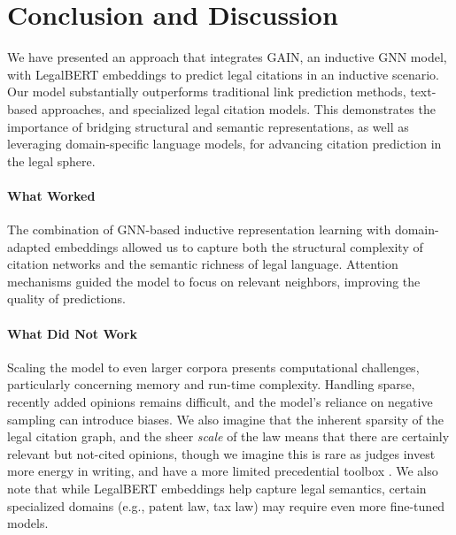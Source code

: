 \documentclass{article}
\begin{document}
\section{Conclusion and Discussion}
We have presented an approach that integrates GAIN, an inductive GNN model, with LegalBERT embeddings to predict legal citations in an inductive scenario. Our model substantially outperforms traditional link prediction methods, text-based approaches, and specialized legal citation models. This demonstrates the importance of bridging structural and semantic representations, as well as leveraging domain-specific language models, for advancing citation prediction in the legal sphere.

\paragraph{What Worked}
The combination of GNN-based inductive representation learning with domain-adapted embeddings allowed us to capture both the structural complexity of citation networks and the semantic richness of legal language. Attention mechanisms guided the model to focus on relevant neighbors, improving the quality of predictions.

\paragraph{What Did Not Work}
Scaling the model to even larger corpora presents computational challenges, particularly concerning memory and run-time complexity. Handling sparse, recently added opinions remains difficult, and the model’s reliance on negative sampling can introduce biases. We also imagine that the inherent sparsity of the legal citation graph, and the sheer \emph{scale} of the law means that there are certainly relevant but not-cited opinions, though we imagine this is rare as judges invest more energy in writing, and have a more limited precedential toolbox \citep{Drobak2008UnderstandingJD, Williams2016}.  We also note that while LegalBERT embeddings help capture legal semantics, certain specialized domains (e.g., patent law, tax law) may require even more fine-tuned models.
\end{document}
